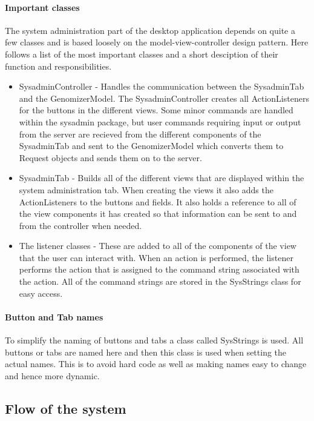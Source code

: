 \paragraph{Important classes}
The system administration part of the desktop application depends on quite a few classes and is based loosely on the model-view-controller design pattern. Here follows a list of the most important classes and a short desciption of their function and responsibilities.
\begin{itemize}
\item SysadminController - Handles the communication between the SysadminTab and the GenomizerModel. The SysadminController creates all ActionListeners for the buttons in the different views. Some minor commands are handled within the sysadmin package, but user commands requiring input or output from the server are recieved from the different components of the SysadminTab and sent to the GenomizerModel which converts them to Request objects and sends them on to the server.
\item SysadminTab - Builds all of the different views that are displayed within the system administration tab. When creating the views it also adds the ActionListeners to the buttons and fields. It also holds a reference to all of the view components it has created so that information can be sent to and from the controller when needed.
\item The listener classes - These are added to all of the components of the view that the user can interact with. When an action is performed, the listener performs the action that is assigned to the command string associated with the action. All of the command strings are stored in the SysStrings class for easy access.
\end{itemize}


\paragraph{Button and Tab names}
\label{Button and Tab names}
To simplify the naming of buttons and tabs a class called SysStrings is used. All buttons or tabs are named here and then this class is used when setting the actual names. This is to avoid hard code as well as making names easy to change and hence more dynamic.

\subsection{Flow of the system}

